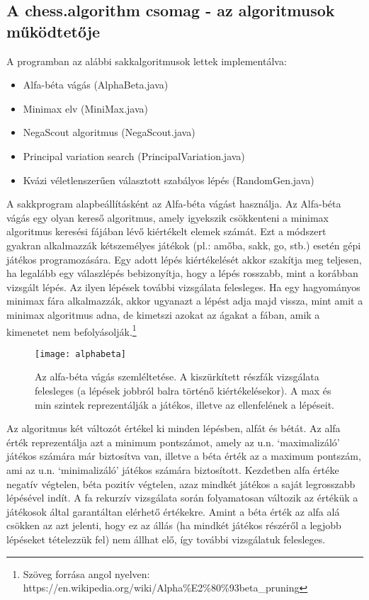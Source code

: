 \documentclass[../documentation.tex]{subfiles}
\begin{document}
\subsection{A chess.algorithm csomag - az algoritmusok működtetője}
A programban az alábbi sakkalgoritmusok lettek implementálva:
\begin{itemize}
	\item Alfa-béta vágás (AlphaBeta.java)
	\item Minimax elv (MiniMax.java)
	\item NegaScout algoritmus (NegaScout.java)
	\item Principal variation search (PrincipalVariation.java)
	\item Kvázi véletlenszerűen választott szabályos lépés (RandomGen.java)
\end{itemize}

A sakkprogram alapbeállításként az Alfa-béta vágást használja. Az Alfa-béta vágás egy olyan kereső algoritmus, amely igyekszik csökkenteni a minimax algoritmus keresési fájában lévő kiértékelt elemek számát. Ezt a módszert gyakran alkalmazzák kétszemélyes játékok (pl.: amőba, sakk, go, stb.) esetén gépi játékos programozására. Egy adott lépés kiértékelését akkor szakítja meg teljesen, ha legalább egy válaszlépés bebizonyítja, hogy a lépés rosszabb, mint a korábban vizsgált lépés. Az ilyen lépések további vizsgálata felesleges. Ha egy hagyományos minimax fára alkalmazzák, akkor ugyanazt a lépést adja majd vissza, mint amit a minimax algoritmus adna, de kimetszi azokat az ágakat a fában, amik a kimenetet nem befolyásolják.\footnote{Szöveg forrása angol nyelven: https://en.wikipedia.org/wiki/Alpha\%E2\%80\%93beta\_pruning}

\begin{figure}[h]
\centering
\texttt{[image: alphabeta]}
\caption{Az alfa-béta vágás szemléltetése. A kiszürkített részfák vizsgálata felesleges (a lépések jobbról balra történő kiértékelésekor). A max és min szintek reprezentálják a játékos, illetve az ellenfelének a lépéseit. \protect\footnotemark}
\label{fig:alphabeta}
\end{figure}

Az algoritmus két változót értékel ki minden lépésben, alfát és bétát. Az alfa érték reprezentálja azt a minimum pontszámot, amely az u.n. `maximalizáló' játékos számára már biztosítva van, illetve a béta érték az a maximum pontszám, ami az u.n. `minimalizáló' játékos számára biztosított. Kezdetben alfa értéke negatív végtelen, béta pozitív végtelen, azaz mindkét játékos a saját legrosszabb lépésével indít. A fa rekurzív vizsgálata során folyamatosan változik az értékük a játékosok által garantáltan elérhető értékekre. Amint a béta érték az alfa alá csökken az azt jelenti, hogy ez az állás (ha mindkét játékos részéről a legjobb lépéseket tételezzük fel) nem állhat elő, így további vizsgálatuk felesleges.
\end{document}
